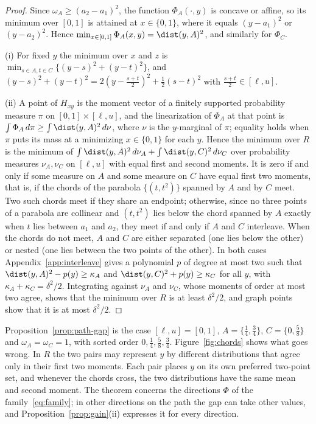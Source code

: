 \begin{proof}
Since $\omega_A\ge(a_2-a_1)^2$, the function $\Phi_A(\cdot,y)$ is concave or
affine, so its minimum over $[0,1]$ is attained at $x\in\{0,1\}$, where it
equals $(y-a_1)^2$ or $(y-a_2)^2$. Hence
$\min_{x\in[0,1]}\Phi_A(x,y)=\dist(y,A)^2$, and similarly for $\Phi_C$.

(i) For fixed $y$ the minimum over $x$ and $z$ is
$\min_{s\in A,t\in C}\{(y-s)^2+(y-t)^2\}$, and
$(y-s)^2+(y-t)^2=2(y-\tfrac{s+t}2)^2+\tfrac12(s-t)^2$ with
$\tfrac{s+t}2\in[\ell,u]$.

(ii) A point of $H_{xy}$ is the moment vector of a finitely supported
probability measure $\pi$ on $[0,1]\times[\ell,u]$, and the linearization of
$\Phi_A$ at that point is $\int\Phi_A\,d\pi\ge\int\dist(y,A)^2\,d\nu$, where
$\nu$ is the $y$-marginal of $\pi$; equality holds when $\pi$ puts its mass
at a minimizing $x\in\{0,1\}$ for each $y$. Hence the minimum over $R$ is
the minimum of $\int\dist(y,A)^2\,d\nu_A+\int\dist(y,C)^2\,d\nu_C$ over
probability measures $\nu_A,\nu_C$ on $[\ell,u]$ with equal first and second
moments. It is zero if and only if some measure on $A$ and some measure on
$C$ have equal first two moments, that is, if the chords of the parabola
$\{(t,t^2)\}$ spanned by $A$ and by $C$ meet. Two such chords meet if they
share an endpoint; otherwise, since no three points of a parabola are
collinear and $(t,t^2)$ lies below the chord spanned by $A$ exactly when $t$
lies between $a_1$ and $a_2$, they meet if and only if $A$ and $C$
interleave. When the chords do not meet, $A$ and $C$ are either separated
(one lies below the other) or nested (one lies between the two points of the
other). In both cases Appendix~\ref{app:interleave} gives a polynomial $p$
of degree at most two such that $\dist(y,A)^2-p(y)\ge\kappa_A$ and
$\dist(y,C)^2+p(y)\ge\kappa_C$ for all $y$, with $\kappa_A+\kappa_C=\delta^2/2$.
Integrating against $\nu_A$ and $\nu_C$, whose moments of order at most two
agree, shows that the minimum over $R$ is at least $\delta^2/2$, and graph
points show that it is at most $\delta^2/2$.
\end{proof}



Proposition~\ref{prop:path-gap} is the case $[\ell,u]=[0,1]$,
$A=\{\tfrac14,\tfrac34\}$, $C=\{0,\tfrac58\}$ and $\omega_A=\omega_C=1$, with
sorted order $0,\tfrac14,\tfrac58,\tfrac34$. Figure~\ref{fig:chords} shows
what goes wrong. In $R$ the two pairs may represent $y$ by different
distributions that agree only in their first two moments. Each pair places
$y$ on its own preferred two-point set, and whenever the chords cross, the
two distributions have the same mean and second moment. The theorem
concerns the directions $\Phi$ of the family~\eqref{eq:family}; in other
directions on the path the gap can take other values, and
Proposition~\ref{prop:gain}(ii) expresses it for every direction.

